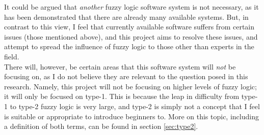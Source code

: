 It could be argued that \textit{another} fuzzy logic software system is not necessary, as it has been demonstrated that there are already many available systems. But, in contrast to this view, I feel that currently available software suffers from certain issues (those mentioned above), and this project aims to resolve these issues, and attempt to spread the influence of fuzzy logic to those other than experts in the field.\\

There will, however, be certain areas that this software system will \textit{not} be focusing on, as I do not believe they are relevant to the question posed in this research. Namely, this project will not be focusing on higher levels of fuzzy logic; it will only be focused on type-1. This is because the leap in difficulty from type-1 to type-2 fuzzy logic is very large, and type-2 is simply not a concept that I feel is suitable or appropriate to introduce beginners to. More on this topic, including a definition of both terms, can be found in section \ref{sec:type2}.\\


\newpage 